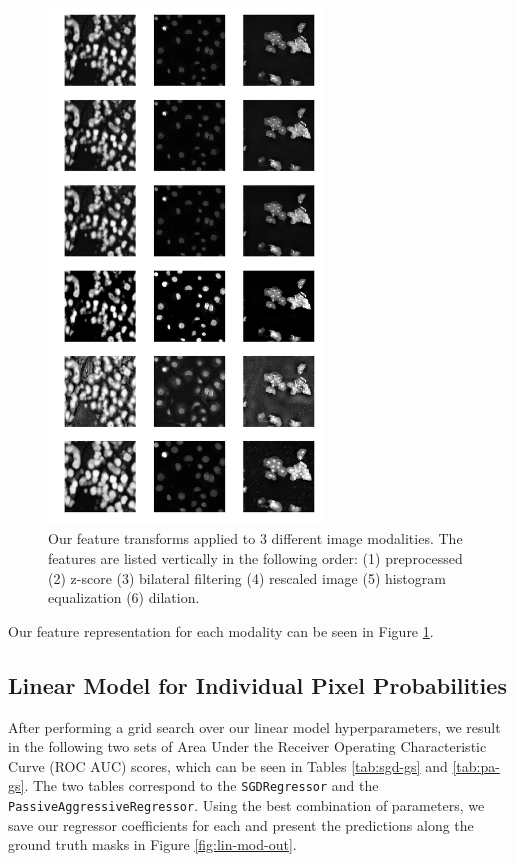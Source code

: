\documentclass[paper=letter, fontsize=12pt]{article}
\numberwithin{equation}{section} %
\numberwithin{figure}{section} %
\numberwithin{table}{section} %
\begin{document}
\begin{figure}[H]
    \centering
    \includegraphics[width=0.65\textwidth]{./figs/hand-designed-features.png}
    \caption{Our feature transforms applied to 3 different image modalities.  The
    features are listed vertically in the following order: (1) preprocessed (2)
    z-score (3) bilateral filtering (4) rescaled image (5) histogram
    equalization (6) dilation.}
    \label{fig:hand-designed-comparison}
\end{figure}

Our feature representation for each modality can be seen in Figure
\ref{fig:hand-designed-comparison}.

\subsection{Linear Model for Individual Pixel Probabilities}

After performing a grid search over our linear model hyperparameters, we result
in the following two sets of Area Under the Receiver Operating Characteristic
Curve (ROC AUC) scores, which can be seen in Tables \ref{tab:sgd-gs} and
\ref{tab:pa-gs}.  The two tables correspond to the \texttt{SGDRegressor} and
the \texttt{PassiveAggressiveRegressor}.  Using the best combination of
parameters, we save our regressor coefficients for each and present the
predictions along the ground truth masks in Figure \ref{fig:lin-mod-out}.
\end{document}
